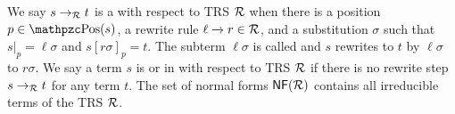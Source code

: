 %
\begin{definition}
	We say \( s\rightarrow_{\mathcal{R}} t \) is a
	 with respect to TRS \( \mathcal{R} \)
	when there is a position \( p \in \pos(s) \),
	a rewrite rule \( \ell\xrightarrow[{}]{} r\in\mathcal{R} \),
	and a substitution \( \sigma \) such that
	\( s|_p=\ell\sigma \) and \( s{[r\sigma]}_p = t \).
		The subterm \( \ell\sigma \) is called  and
	\( s \) rewrites to \( t \) by  \( \ell\sigma \) to  \( r\sigma \).
	We say a term \( s \) is  or in  with respect to TRS \( \mathcal{R} \) if there is no rewrite step \( s\rightarrow_{\mathcal{R}} t \) for any term \( t \).
	The set of normal forms \( \mathsf{NF} (\mathcal{R}) \) contains all irreducible terms of the TRS \( \mathcal{R} \).

	\end{definition}

